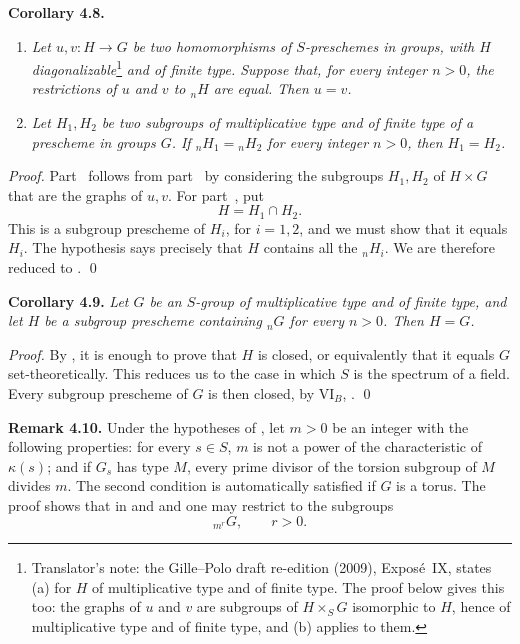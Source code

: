 \medskip
\noindent{}\textbf{Corollary 4.8.}
\begin{enumerate}
  \item[(a)]
  \textit{Let \(u,v:H\to G\) be two homomorphisms of \(S\)-preschemes
  in groups, with \(H\) diagonalizable}\footnote{Translator's note: the
  Gille--Polo draft re-edition (2009), Expos\'e~IX, states (a) for \(H\)
  of multiplicative type and of finite type. The proof below gives this
  too: the graphs of \(u\) and \(v\) are subgroups of \(H\times_SG\)
  isomorphic to \(H\), hence of multiplicative type and of finite type,
  and (b) applies to them.}%
  \textit{ and of finite type. Suppose that, for every integer \(n>0\),
  the restrictions of \(u\) and \(v\) to \({}_nH\) are equal. Then
  \(u=v\).}

  \item[(b)]
  \textit{Let \(H_1,H_2\) be two subgroups of multiplicative type and
  of finite type of a prescheme in groups \(G\). If
  \({}_nH_1={}_nH_2\) for every integer \(n>0\), then \(H_1=H_2\).}
\end{enumerate}

\emph{Proof.}
Part~ follows from part~ by considering the subgroups \(H_1,H_2\)
of \(H\times G\) that are the graphs of \(u,v\). For part~, put
\[
  H=H_1\cap H_2.
\]
This is a subgroup prescheme of \(H_i\), for \(i=1,2\), and we must show
that it equals \(H_i\). The hypothesis says precisely that \(H\)
contains all the \({}_nH_i\). We are therefore reduced to . \qed

\medskip
\noindent{}\textbf{Corollary 4.9.}
\textit{Let \(G\) be an \(S\)-group of multiplicative type and of finite
type, and let \(H\) be a subgroup prescheme containing \({}_nG\) for
every \(n>0\). Then \(H=G\).}

\emph{Proof.}
By , it is enough to prove that
\(H\) is closed, or equivalently that it equals \(G\) set-theoretically.
This reduces us to the case in which \(S\) is the spectrum of a field.
Every subgroup prescheme of \(G\) is then closed, by VI\(_B\), .
\qed

\medskip
\noindent{}\textbf{Remark 4.10.}
Under the hypotheses of , let
\(m>0\) be an integer with the following properties: for every
\(s\in S\), \(m\) is not a power of the characteristic of \(\kappa(s)\);
and if \(G_s\) has type \(M\), every prime divisor of the torsion
subgroup of \(M\) divides \(m\). The second condition is automatically
satisfied if \(G\) is a torus. The proof shows that in
 and
 and
 one may restrict to
the subgroups
\[
  {}_{m^r}G,\qquad r>0.
\]

